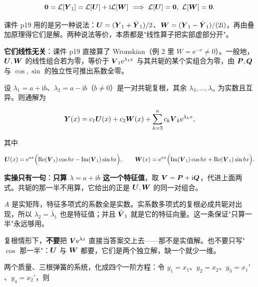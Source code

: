 \documentclass[11pt]{ctexart}
\begin{document}
\[
\vect{0}=\mathcal{L}[\vect{Y}_1]=\mathcal{L}[\vect{U}]+\mathrm{i}\mathcal{L}[\vect{W}]
\ \Longrightarrow\ \mathcal{L}[\vect{U}]=\vect{0},\ \mathcal{L}[\vect{W}]=\vect{0}.
\]

课件 p19 用的是另一种说法：$\boldsymbol{U}=(\boldsymbol{Y}_1+\bar{\boldsymbol{Y}}_1)/2$、$\boldsymbol{W}=(\boldsymbol{Y}_1-\bar{\boldsymbol{Y}}_1)/(2\mathrm{i})$，再由叠加原理得它们是解。两种说法等价，本质都是"线性算子把实部虚部分开"。

\textbf{它们线性无关}：课件 p19 直接算了 Wronskian（例 2 里 $W=\mathrm{e}^{-x}\neq0$）。一般地，$\boldsymbol{U},\boldsymbol{W}$ 的线性组合若为零，等价于 $\boldsymbol{V}_1\mathrm{e}^{\lambda_1x}$ 与其共轭的某个实组合为零，由 $\boldsymbol{P},\boldsymbol{Q}$ 与 $\cos,\sin$ 的独立性可推出系数全零。


设 $\lambda_1=a+\mathrm{i}b$、$\lambda_2=a-\mathrm{i}b$（$b\neq0$）是一对共轭复根，其余 $\lambda_3,\dots,\lambda_n$ 为实数且互异。则通解为

\[
\boldsymbol{Y}(x)=c_1\boldsymbol{U}(x)+c_2\boldsymbol{W}(x)+\sum_{k=3}^{n}c_k\boldsymbol{V}_k\mathrm{e}^{\lambda_k x},
\]

其中

\[
\boldsymbol{U}(x)=\mathrm{e}^{ax}\Bigl(\operatorname{Re}(\boldsymbol{V}_1)\cos bx-\operatorname{Im}(\boldsymbol{V}_1)\sin bx\Bigr),
\qquad
\boldsymbol{W}(x)=\mathrm{e}^{ax}\Bigl(\operatorname{Im}(\boldsymbol{V}_1)\cos bx+\operatorname{Re}(\boldsymbol{V}_1)\sin bx\Bigr).
\]

\textbf{实操只有一句}：\textbf{只算 $\lambda=a+\mathrm{i}b$ 这一个特征值}，取 $\boldsymbol{V}=\boldsymbol{P}+\mathrm{i}\boldsymbol{Q}$，代进上面两式。共轭的那一半不用算，它给出的正是 $\boldsymbol{U},\boldsymbol{W}$ 的同一对组合。


$A$ 是实矩阵，特征多项式的系数全是实数。实系数多项式的复根必成共轭对出现，所以 $\lambda_2=\bar\lambda_1$ 也是特征值；并且 $\bar{\boldsymbol{V}}_1$ 就是它的特征向量。这一条保证"只算一半"永远够用。


复根情形下，\textbf{不要}把 $\boldsymbol{V}\mathrm{e}^{\lambda x}$ 直接当答案交上去——那不是实值解。也不要只写"$\cos$ 那一半"：$\boldsymbol{U}$ 与 $\boldsymbol{W}$ 都要，它们是两个独立解，缺一个就少一维。



两个质量、三根弹簧的系统，化成四个一阶方程：令 $y_1=x_1$、$y_2=x_2$、$y_3=x_1'$、$y_4=x_2'$，则
\end{document}
